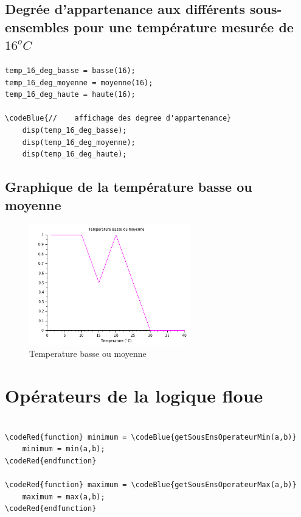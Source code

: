 \documentclass[a4paper,10pt]{article}
\begin{document}
\newpage

\subsection{Degr\'ee d'appartenance aux diff\'erents sous-ensembles pour une temp\'erature mesur\'ee de $16^oC$  }

\begin{Verbatim}[commandchars=\\\{\}]
temp_16_deg_basse = basse(16);
temp_16_deg_moyenne = moyenne(16);
temp_16_deg_haute = haute(16);

\codeBlue{//    affichage des degree d'appartenance}
    disp(temp_16_deg_basse);
    disp(temp_16_deg_moyenne);
    disp(temp_16_deg_haute);
\end{Verbatim}


\subsection{Graphique de la temp\'erature basse ou moyenne}

\begin{figure}[ht]
\begin{center}
	\includegraphics[width=7cm]{images/basse_ou_moyenne.png}
\end{center}
	\caption{Temperature basse ou moyenne}
	\label{basse_ou_moyenne}
\end{figure}

\section{Op\'erateurs de la logique floue}

\begin{Verbatim}[commandchars=\\\{\}]

\codeRed{function} minimum = \codeBlue{getSousEnsOperateurMin(a,b)}
    minimum = min(a,b);
\codeRed{endfunction}

\codeRed{function} maximum = \codeBlue{getSousEnsOperateurMax(a,b)}
    maximum = max(a,b);
\codeRed{endfunction}

\end{Verbatim}
\end{document}
